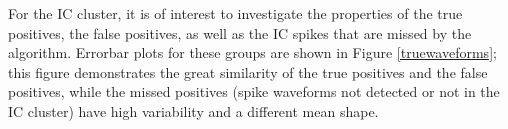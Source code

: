 For the IC cluster, it is of interest to investigate the properties of the true positives, the false positives, as well as the IC spikes that are missed by the algorithm.  Errorbar plots for these groups are shown in Figure \ref{truewaveforms}; this figure demonstrates the great similarity of the true positives and the false positives, while the missed positives (spike waveforms not detected or not in the IC cluster) have high variability and a different mean shape.
